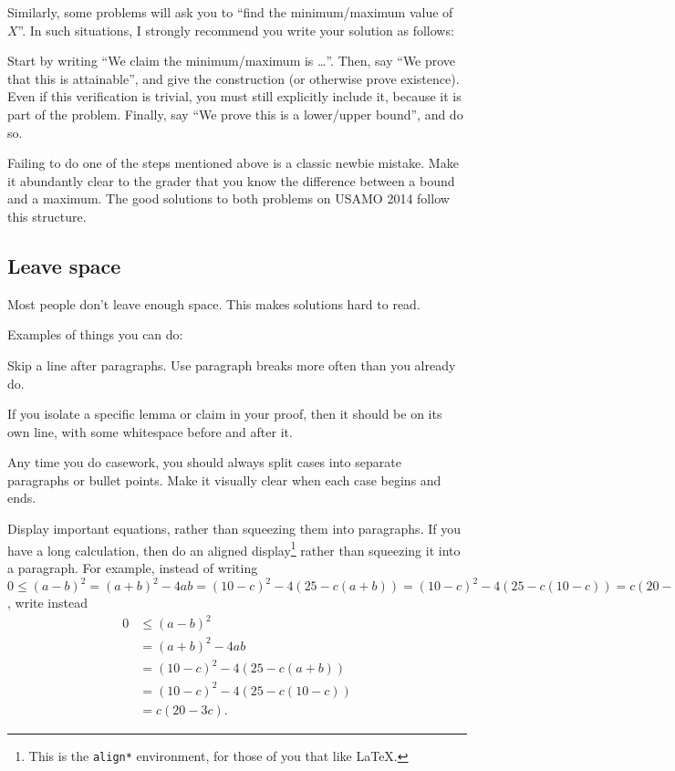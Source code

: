 \documentclass[11pt]{scrartcl}
\begin{document}
Similarly, some problems will ask you to ``find the minimum/maximum value of $X$''.
In such situations, I strongly recommend you write your solution as follows:
\begin{itemize}
  \ii Start by writing ``\alert{We claim the minimum/maximum is \dots}''.
  \ii Then, say ``\alert{We prove that this is attainable}'',
  and give the construction (or otherwise prove existence).
  Even if this verification is trivial, you must still explicitly include it,
  because it is part of the problem.
  \ii Finally, say ``\alert{We prove this is a lower/upper bound}'', and do so.
\end{itemize}

Failing to do one of the steps mentioned above is a classic newbie mistake.
Make it abundantly clear to the grader that you know the difference
between a bound and a maximum.
The good solutions to both problems on USAMO 2014 follow this structure.

\subsection{Leave space}
Most people don't leave enough space. This makes solutions hard to read.

Examples of things you can do:
\begin{itemize}
  \ii \alert{Skip a line after paragraphs}.
  Use paragraph breaks more often than you already do.

  \ii If you isolate a specific \alert{lemma or claim} in your proof,
  then it should be on its own line,
  with some whitespace before and after it.

  \ii Any time you do casework,
  you should always \alert{split cases into separate paragraphs or bullet points}.
  Make it visually clear when each case begins and ends.

  \ii Display important equations, rather than squeezing them into paragraphs.
  If you have a long calculation,
  then do an aligned display\footnote{This is the
    \texttt{align*} environment, for those of you that like \LaTeX.}
  rather than squeezing it into a paragraph.
  For example, instead of writing $0 \le {(a - b)^2} = {(a + b)^2} - 4ab = {(10 - c)^2} - 4\left( {25 - c(a + b)} \right) = {(10 - c)^2} - 4\left( {25 - c(10 - c)} \right) = c(20 - 3c)$, write instead
  \begin{align*}
    0 &\le {(a - b)^2}\\
     &= {(a + b)^2} - 4ab\\
     &= {(10 - c)^2} - 4\left( {25 - c(a + b)} \right)\\
     &= {(10 - c)^2} - 4\left( {25 - c(10 - c)} \right)\\
     &= c(20 - 3c).
  \end{align*}
\end{itemize}
\end{document}
